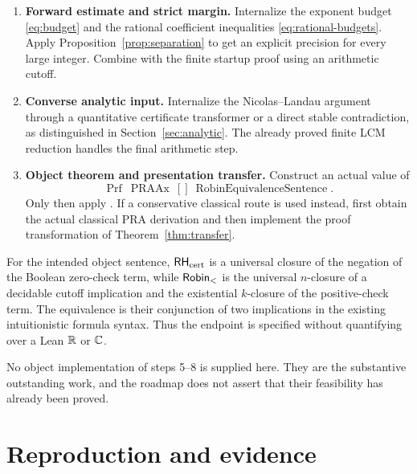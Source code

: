 \begin{enumerate}[leftmargin=*]
\item \textbf{Forward estimate and strict margin.}
Internalize the exponent budget \eqref{eq:budget} and the rational
coefficient inequalities \eqref{eq:rational-budgets}. Apply
Proposition~\ref{prop:separation} to get an explicit precision
for every large integer. Combine with the finite startup proof
using an arithmetic cutoff.

\item \textbf{Converse analytic input.}
Internalize the Nicolas--Landau argument through a quantitative
certificate transformer or a direct stable contradiction,
as distinguished in Section~\ref{sec:analytic}. The already proved
finite LCM reduction handles the final arithmetic step.

\item \textbf{Object theorem and presentation transfer.}
Construct an actual value of
\[
 \operatorname{Prf}\ \operatorname{PRAAx}\ []
              \ \operatorname{RobinEquivalenceSentence}.
\]
Only then apply . If a conservative classical
route is used instead, first obtain the actual classical PRA
derivation and then implement the proof transformation of
Theorem~\ref{thm:transfer}.
\end{enumerate}

For the intended object sentence, $\mathsf{RH}_{\rm cert}$ is a universal closure
of the negation of the Boolean zero-check term, while $\mathsf{Robin}_{<}$ is
the universal $n$-closure of a decidable cutoff implication and
the existential $k$-closure of the positive-check term.
The equivalence is their conjunction of two implications in the
existing intuitionistic formula syntax. Thus the endpoint is
specified without quantifying over a Lean $\mathbb R$ or $\mathbb C$.

No object implementation of steps 5--8 is supplied here. They are
the substantive outstanding work, and the roadmap does not assert
that their feasibility has already been proved.

\section{Reproduction and evidence}

